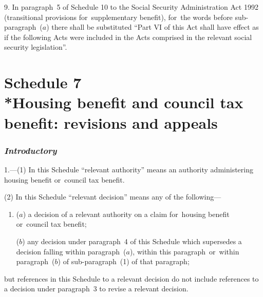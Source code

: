\documentclass[12pt,a4paper]{article}
\begin{document}
\medskip

9. In paragraph~5 of Schedule 10 to the Social Security Administration Act 1992 (transitional provisions for~supplementary benefit), for~the words before sub-paragraph~($a$)  there shall be substituted “Part VI of this Act shall have effect as if the following Acts were included in the Acts comprised in the relevant social security legislation”.

\part[Schedule 7 --- Housing benefit and council tax benefit: revisions and appeals]{Schedule 7\\*Housing benefit and council tax benefit: revisions and appeals}

\renewcommand\parthead{--- Schedule 7}


\section*{\itshape Introductory}

1.---(1) In this Schedule “relevant authority” means an authority administering housing benefit or~council tax benefit.

(2) In this Schedule “relevant decision” means any of the following—
\begin{enumerate}\item[]
($a$) a decision of a relevant authority on a claim for~housing benefit or~council tax benefit;

($b$) any decision under paragraph~4 of this Schedule which supersedes a decision falling within paragraph~($a$), within this paragraph~or~within paragraph~($b$)  of sub-paragraph~(1)  of that paragraph;

\end{enumerate}
but references in this Schedule to a relevant decision do not include references to a decision under paragraph~3 to revise a relevant decision.
\end{document}
